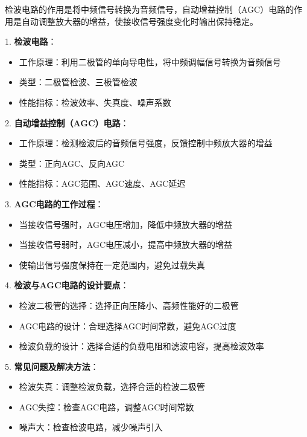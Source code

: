 \documentclass[12pt,UTF8]{ctexbook}
\begin{document}
检波电路的作用是将中频信号转换为音频信号，自动增益控制（AGC）电路的作用是自动调整放大器的增益，使接收信号强度变化时输出保持稳定。

1. \textbf{检波电路}：
   \begin{itemize}[leftmargin=3.5em]
   \item 工作原理：利用二极管的单向导电性，将中频调幅信号转换为音频信号
   \item 类型：二极管检波、三极管检波
   \item 性能指标：检波效率、失真度、噪声系数
   \end{itemize}

2. \textbf{自动增益控制（AGC）电路}：
   \begin{itemize}[leftmargin=3.5em]
   \item 工作原理：检测检波后的音频信号强度，反馈控制中频放大器的增益
   \item 类型：正向AGC、反向AGC
   \item 性能指标：AGC范围、AGC速度、AGC延迟
   \end{itemize}

3. \textbf{AGC电路的工作过程}：
   \begin{itemize}[leftmargin=3.5em]
   \item 当接收信号强时，AGC电压增加，降低中频放大器的增益
   \item 当接收信号弱时，AGC电压减小，提高中频放大器的增益
   \item 使输出信号强度保持在一定范围内，避免过载失真
   \end{itemize}

4. \textbf{检波与AGC电路的设计要点}：
   \begin{itemize}[leftmargin=3.5em]
   \item 检波二极管的选择：选择正向压降小、高频性能好的二极管
   \item AGC电路的设计：合理选择AGC时间常数，避免AGC过度
   \item 检波负载的设计：选择合适的负载电阻和滤波电容，提高检波效率
   \end{itemize}

5. \textbf{常见问题及解决方法}：
   \begin{itemize}[leftmargin=3.5em]
   \item 检波失真：调整检波负载，选择合适的检波二极管
   \item AGC失控：检查AGC电路，调整AGC时间常数
   \item 噪声大：检查检波电路，减少噪声引入
   \end{itemize}
\end{document}
